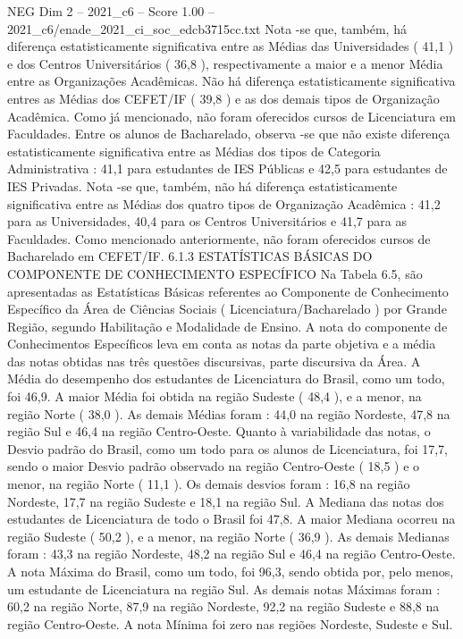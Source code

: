 \begin{textsample}{NEG Dim 2 – 2021\_c6 – Score 1.00 – 2021\_c6/enade\_2021\_ci\_soc\_edcb3715cc.txt}
Nota -se que, também, há diferença estatisticamente significativa entre as Médias das Universidades ( 41,1 ) e dos Centros Universitários ( 36,8 ), respectivamente a maior e a menor Média entre as Organizações Acadêmicas.
Não há diferença estatisticamente significativa entres as Médias dos CEFET/IF ( 39,8 ) e as dos demais tipos de Organização Acadêmica.
Como já mencionado, não foram oferecidos cursos de Licenciatura em Faculdades.
Entre os alunos de Bacharelado, observa -se que não existe diferença estatisticamente significativa entre as Médias dos tipos de Categoria Administrativa : 41,1 para estudantes de IES Públicas e 42,5 para estudantes de IES Privadas.
Nota -se que, também, não há diferença estatisticamente significativa entre as Médias dos quatro tipos de Organização Acadêmica : 41,2 para as Universidades, 40,4 para os Centros Universitários e 41,7 para as Faculdades.
Como mencionado anteriormente, não foram oferecidos cursos de Bacharelado em CEFET/IF. 6.1.3 ESTATÍSTICAS BÁSICAS DO COMPONENTE DE CONHECIMENTO ESPECÍFICO Na Tabela 6.5, são apresentadas as Estatísticas Básicas referentes ao Componente de Conhecimento Específico da Área de Ciências Sociais ( Licenciatura/Bacharelado ) por Grande Região, segundo Habilitação e Modalidade de Ensino.
A nota do componente de Conhecimentos Específicos leva em conta as notas da parte objetiva e a média das notas obtidas nas três questões discursivas, parte discursiva da Área.
A Média do desempenho dos estudantes de Licenciatura do Brasil, como um todo, foi 46,9.
A maior Média foi obtida na região Sudeste ( 48,4 ), e a menor, na região Norte ( 38,0 ).
As demais Médias foram : 44,0 na região Nordeste, 47,8 na região Sul e 46,4 na região Centro-Oeste.
Quanto à variabilidade das notas, o Desvio padrão do Brasil, como um todo para os alunos de Licenciatura, foi 17,7, sendo o maior Desvio padrão observado na região Centro-Oeste ( 18,5 ) e o menor, na região Norte ( 11,1 ).
Os demais desvios foram : 16,8 na região Nordeste, 17,7 na região Sudeste e 18,1 na região Sul.
A Mediana das notas dos estudantes de Licenciatura de todo o Brasil foi 47,8.
A maior Mediana ocorreu na região Sudeste ( 50,2 ), e a menor, na região Norte ( 36,9 ).
As demais Medianas foram : 43,3 na região Nordeste, 48,2 na região Sul e 46,4 na região Centro-Oeste.
A nota Máxima do Brasil, como um todo, foi 96,3, sendo obtida por, pelo menos, um estudante de Licenciatura na região Sul.
As demais notas Máximas foram : 60,2 na região Norte, 87,9 na região Nordeste, 92,2 na região Sudeste e 88,8 na região Centro-Oeste.
A nota Mínima foi zero nas regiões Nordeste, Sudeste e Sul.

\end{textsample}
